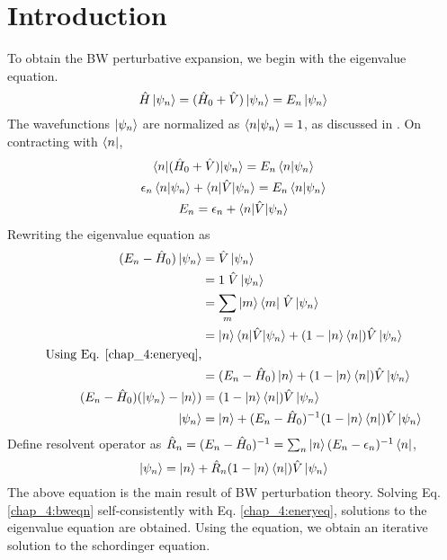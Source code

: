 \section{Introduction}
To obtain the BW perturbative expansion, we begin with the eigenvalue equation. 
\begin{equation*}
 \hat{H}\ket{\psi_n} = (\hat{H}_{0} + \hat{V})\ket{\psi_n} = E_n\ket{\psi_n}
\end{equation*}
The wavefunctions $\ket{\psi_n}$ are normalized as $\braket{n|\psi_n} = 1$, as discussed in \cite{sakurai2011modern}. On 
contracting with $\bra{n}$,
\begin{gather}
 \braket{n|(\hat{H}_{0} + \hat{V})| \psi_n} = E_n\braket{n|\psi_n} \nonumber \\
 \epsilon_n \braket{n|\psi_n} + \braket{n|\hat{V}|\psi_n} = E_n\braket{n|\psi_n} \nonumber \\
 \label{chap_4:eneryeq} E_n = \epsilon_n + \braket{n|\hat{V}|\psi_n}
\end{gather}
Rewriting the eigenvalue equation as
\begin{align*}
 (E_n - \hat{H}_{0})\ket{\psi_n} &= \hat{V}\ket{\psi_n} \\
 &= \mathrm{1}\; \hat{V}\ket{\psi_n} \\
 &= \sum_{m}{\ket{m}\bra{m}}\; \hat{V}\ket{\psi_n} \\
 &= \ket{n}\braket{n|\hat{V}|\psi_n} + (\mathrm{1} - \ket{n}\bra{n})\hat{V}\ket{\psi_n} \\
 \text{Using Eq. \ref{chap_4:eneryeq},} \\
 &= (E_n - \hat{H}_{0})\ket{n} + (\mathrm{1} - \ket{n}\bra{n})\hat{V}\ket{\psi_n} \\
 (E_n - \hat{H}_{0}) (\ket{\psi_n} - \ket{n}) &= (\mathrm{1} - \ket{n}\bra{n})\hat{V}\ket{\psi_n} \\
 \ket{\psi_n} &= \ket{n} + (E_n - \hat{H}_{0})^{-1} (\mathrm{1} - \ket{n}\bra{n})\hat{V}\ket{\psi_n}
\end{align*}
Define resolvent operator as $\hat{R}_{n} = (E_n - \hat{H}_{0})^{-1} = \sum_{n}{\ket{n}(E_n - \epsilon_n)^{-1} \bra{n}}$,
\begin{equation}
  \label{chap_4:bweqn}\ket{\psi_n} = \ket{n} +  \hat{R}_{n}(\mathrm{1} - \ket{n}\bra{n})\hat{V}\ket{\psi_n}
\end{equation}
The above equation is the main result of BW perturbation theory. Solving Eq. \eqref{chap_4:bweqn} self-consistently with 
Eq. \eqref{chap_4:eneryeq}, solutions to the eigenvalue equation are obtained. Using the equation, we obtain an iterative solution to the schordinger equation. 
